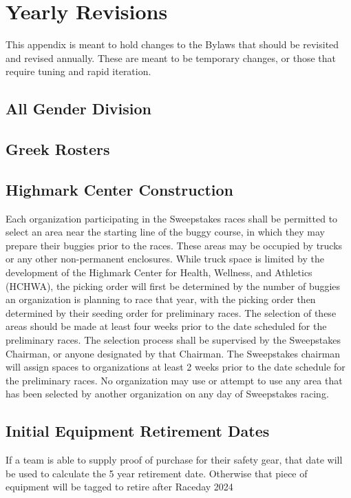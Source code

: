 \section{Yearly Revisions}

This appendix is meant to hold changes to the Bylaws that should be revisited and revised annually. These are meant to be temporary changes, or those that require tuning and rapid iteration. 

\subsection*{All Gender Division} \label{All Gender}

\subsection*{Greek Rosters}

\subsection*{Highmark Center Construction} \label{Seeding Area}
Each organization participating in the Sweepstakes races shall be permitted to select an area near the starting line of the buggy course, in which they may prepare their buggies prior to the races. These areas may be occupied by trucks or any other non-permanent enclosures. While truck space is limited by the development of the Highmark Center for Health, Wellness, and Athletics (HCHWA), the picking order will first be determined by the number of buggies an organization is planning to race that year, with the picking order then determined by their seeding order for preliminary races. The selection of these areas should be made at least four weeks prior to the date scheduled for the preliminary races. The selection process shall be supervised by the Sweepstakes Chairman, or anyone designated by that Chairman. The Sweepstakes chairman will assign spaces to organizations at least 2 weeks prior to the date schedule for the preliminary races. No organization may use or attempt to use any area that has been selected by another organization on any day of Sweepstakes racing.

\subsection*{Initial Equipment Retirement Dates}
If a team is able to supply proof of purchase for their safety gear, that date will be used to calculate the 5 year retirement date. Otherwise that piece of equipment will be tagged to retire after Raceday 2024